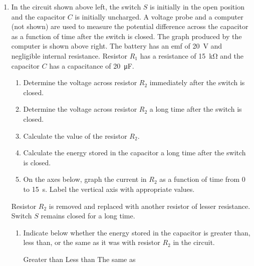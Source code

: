 \documentclass{../../../oss-classkick}
\begin{document}
\begin{enumerate}
\item In the circuit shown above left, the switch $S$ is initially in the
  open position and the capacitor $C$ is initially uncharged. A voltage probe
  and a computer (not shown) are used to measure the potential difference
  across the capacitor as a function of time after the switch is closed. The
  graph produced by the computer is shown above right. The battery has an emf
  of \SI{20}{\volt} and negligible internal resistance. Resistor $R_1$ has a
  resistance of \SI{15}{\kilo\ohm} and the capacitor $C$ has a capacitance of
  \SI{20}{\micro\farad}.
  \begin{enumerate}
  \item Determine the voltage across resistor $R_2$ immediately after the
    switch is closed.
  \item Determine the voltage across resistor $R_2$ a long time after the
    switch is closed.
  \item Calculate the value of the resistor $R_2$.
  \item Calculate the energy stored in the capacitor a long time after the
    switch is closed.
  \item On the axes below, graph the current in $R_2$ as a function of time
    from 0 to \SI{15}{\second}. Label the vertical axis with appropriate
    values.
    \begin{center}
    \end{center}
  \end{enumerate}
  Resistor $R_2$ is removed and replaced with another resistor of lesser
  resistance. Switch $S$ remains closed for a long time.
  \begin{enumerate}
  \item Indicate below whether the energy stored in the capacitor is greater
    than, less than, or the same as it was with resistor $R_2$ in the circuit.

    \vspace{.1in}
    \underline{\hspace{.2in}} Greater than\hspace{.3in}
    \underline{\hspace{.2in}} Less than\hspace{.3in}
    \underline{\hspace{.2in}} The same as
    

\end{enumerate}
\end{enumerate}
\end{document}

